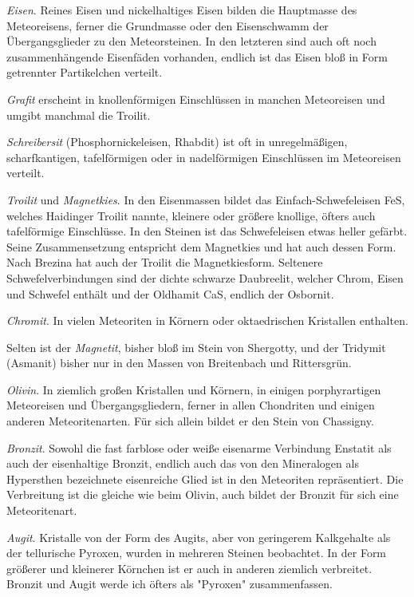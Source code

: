 \documentclass[a4paper, 12pt, oneside]{article}
\begin{document}
\emph{Eisen}. Reines Eisen und nickelhaltiges Eisen bilden die Hauptmasse des Meteoreisens, ferner die Grundmasse oder den Eisenschwamm der Übergangsglieder zu den Meteorsteinen. In den letzteren sind auch oft noch zusammenhängende Eisenfäden vorhanden, endlich ist das Eisen bloß in Form getrennter Partikelchen verteilt.

\emph{Grafit} erscheint in knollenförmigen Einschlüssen in manchen Meteoreisen und umgibt manchmal die Troilit.

\emph{Schreibersit} (Phosphornickeleisen, Rhabdit) ist oft in unregelmäßigen, scharfkantigen, tafelförmigen oder in nadelförmigen Einschlüssen im Meteoreisen verteilt.

\emph{Troilit} und \emph{Magnetkies}. In den Eisenmassen bildet das Einfach-Schwefeleisen FeS, welches Haidinger Troilit nannte, kleinere oder größere knollige, öfters auch tafelförmige Einschlüsse. In den Steinen ist das Schwefeleisen etwas heller gefärbt. Seine Zusammensetzung entspricht dem Magnetkies und hat auch dessen Form. Nach Brezina hat auch der Troilit die Magnetkiesform. Seltenere Schwefelverbindungen sind der dichte schwarze Daubreelit, welcher Chrom, Eisen und Schwefel enthält und der Oldhamit CaS, endlich der Osbornit.

\emph{Chromit}. In vielen Meteoriten in Körnern oder oktaedrischen Kristallen enthalten.

Selten ist der \emph{Magnetit}, bisher bloß im Stein von Shergotty, und der Tridymit (Asmanit) bisher nur in den Massen von Breitenbach und Rittersgrün.

\emph{Olivin}. In ziemlich großen Kristallen und Körnern, in einigen porphyrartigen Meteoreisen und Übergangsgliedern, ferner in allen Chondriten und einigen anderen Meteoritenarten. Für sich allein bildet er den Stein von Chassigny.

\emph{Bronzit}. Sowohl die fast farblose oder weiße eisenarme Verbindung Enstatit als auch der eisenhaltige Bronzit, endlich auch das von den Mineralogen als Hypersthen bezeichnete eisenreiche Glied ist in den Meteoriten repräsentiert. Die Verbreitung ist die gleiche wie beim Olivin, auch bildet der Bronzit für sich eine Meteoritenart.

\emph{Augit}. Kristalle von der Form des Augits, aber von geringerem Kalkgehalte als der tellurische Pyroxen, wurden in mehreren Steinen beobachtet. In der Form größerer und kleinerer Körnchen ist er auch in anderen ziemlich verbreitet. Bronzit und Augit werde ich öfters als "Pyroxen" zusammenfassen.
\end{document}
